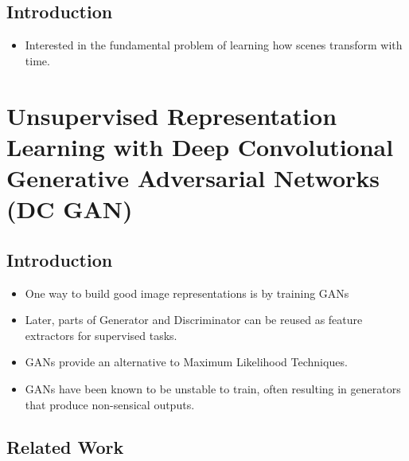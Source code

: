 \documentclass{article}
\begin{document}
    \subsection{Introduction}\label{subsec:Generating_Videos_with_Scene_Dynamics:introduction}
    \begin{itemize}
        \item Interested in the fundamental problem of learning how scenes transform with time.
    \end{itemize}
    \newpage


    \section{Unsupervised Representation Learning with Deep Convolutional Generative Adversarial Networks (DC GAN)}\label{sec:Unsupervised_Representation_Learning_with_Deep_Convolutional_Generative_Adversarial_Networks_(DC_GAN)}

    \subsection{Introduction}\label{subsec:Unsupervised_Representation_Learning_with_Deep_Convolutional_Generative_Adversarial_Networks_(DC_GAN):introduction}
    \begin{itemize}
        \item One way to build good image representations is by training GANs
        \item Later, parts of Generator and Discriminator can be reused as feature extractors for supervised tasks.
        \item GANs provide an alternative to Maximum Likelihood Techniques.
        \item GANs have been known to be unstable to train, often resulting in generators that produce non-sensical outputs.
    \end{itemize}

    \subsection{Related Work}\label{subsec:Unsupervised_Representation_Learning_with_Deep_Convolutional_Generative_Adversarial_Networks_(DC_GAN):related-work}
\end{document}
